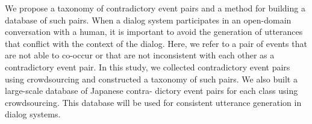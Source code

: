We propose a taxonomy of contradictory event pairs and a method for building a database of such pairs. When a dialog system participates in an open-domain conversation with a human, it is important to avoid the generation of utterances that conflict with the context of the dialog. Here, we refer to a pair of events that are not able to co-occur or that are not inconsistent with each other as a contradictory event pair. In this study, we collected contradictory event pairs using crowdsourcing and constructed a taxonomy of such pairs. We also built a large-scale database of Japanese contra- dictory event pairs for each class using crowdsourcing. This database will be used for consistent utterance generation in dialog systems.
